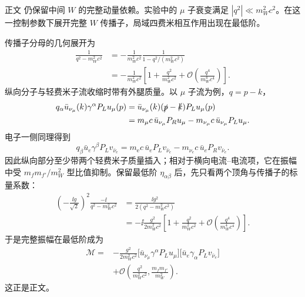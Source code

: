 \begin{derivation}
正文 仍保留中间 $W$ 的完整动量依赖。实验中的 $\mu$ 子衰变满足 $|q^2|\ll m_W^2c^2$。在这一控制参数下展开完整 $W$ 传播子，局域四费米相互作用出现在最低阶。

传播子分母的几何展开为
\begin{align*}
\frac{1}{q^2-m_W^2c^2}
&=-\frac{1}{m_W^2c^2}\frac{1}{1-q^2/(m_W^2c^2)}\\
&=-\frac{1}{m_W^2c^2}
\left[1+\frac{q^2}{m_W^2c^2}
+\mathcal O\!\left(\frac{q^4}{m_W^4c^4}\right)\right].
\end{align*}
纵向分子与轻费米子流收缩时带有外腿质量。以 $\mu$ 子流为例，$q=p-k$，
\begin{align*}
q_\alpha\bar u_{\nu_\mu}(k)\gamma^\alpha P_Lu_\mu(p)
&=\bar u_{\nu_\mu}(k)(\slashed p-\slashed k)P_Lu_\mu(p)\\
&=m_\mu c\,\bar u_{\nu_\mu}P_Ru_\mu
-m_{\nu_\mu}c\,\bar u_{\nu_\mu}P_Lu_\mu.
\end{align*}
电子一侧同理得到
\begin{equation*}
q_\beta\bar u_e\gamma^\beta P_Lv_{\bar\nu_e}
=m_{\mathrm e} c\,\bar u_eP_Lv_{\bar\nu_e}
-m_{\nu_e}c\,\bar u_eP_Rv_{\bar\nu_e}.
\end{equation*}
因此纵向部分至少带两个轻费米子质量插入；相对于横向电流--电流项，它在振幅中受 $m_fm_{f'}/m_W^2$ 型比值抑制。保留最低阶 $\eta_{\alpha\beta}$ 后，先只看两个顶角与传播子的标量系数：
\begin{align*}
\left(-\frac{\ii g}{\sqrt2}\right)^2
\frac{-\ii}{q^2-m_W^2c^2}
&=\frac{\ii g^2}{2(q^2-m_W^2c^2)}\\
&=-\ii\frac{g^2}{2m_W^2c^2}
\left[1+\frac{q^2}{m_W^2c^2}
+\mathcal O\!\left(\frac{q^4}{m_W^4c^4}\right)\right].
\end{align*}
于是完整振幅在最低阶成为
\begin{align*}
\mathcal M
={}&-\frac{g^2}{2m_W^2c^2}
\bigl[\bar u_{\nu_\mu}\gamma^\alpha P_Lu_\mu\bigr]
\bigl[\bar u_e\gamma_\alpha P_Lv_{\bar\nu_e}\bigr]\\
&+\mathcal O\!\left(
\frac{q^2}{m_W^2c^2},
\frac{m_fm_{f'}}{m_W^2}
\right).
\end{align*}
这正是正文。
\end{derivation}



